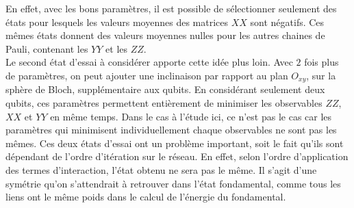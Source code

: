 \documentclass[../main.tex]{subfiles}
\begin{document}
        En effet, avec les bons paramètres, il est possible de sélectionner
        seulement des états pour lesquels les valeurs moyennes des matrices $XX$
        sont négatifs. Ces mêmes états donnent des valeurs moyennes nulles pour
        les autres chaines de Pauli, contenant les $YY$ et les $ZZ$.\\
        Le second état d'essai à considérer apporte cette idée plus loin. Avec
        $2$ fois plus de paramètres, on peut ajouter une inclinaison par rapport
        au plan $O_{xy}$, sur la sphère de Bloch, supplémentaire aux qubits.
        En considérant seulement deux qubits, ces paramètres permettent entièrement
        de minimiser les observables $ZZ$, $XX$ et $YY$ en même temps. Dans le cas
        à l'étude ici, ce n'est pas le cas car les paramètres qui minimisent
        individuellement chaque observables ne sont pas les mêmes. Ces deux états
        d'essai ont un problème important, soit le fait qu'ils sont dépendant
        de l'ordre d'itération sur le réseau. En effet, selon l'ordre d'application
        des termes d'interaction, l'état obtenu ne sera pas le même. Il s'agit
        d'une symétrie qu'on s'attendrait à retrouver dans l'état fondamental, comme
        tous les liens ont le même poids dans le calcul de l'énergie du fondamental.





\clearpage
\end{document}
